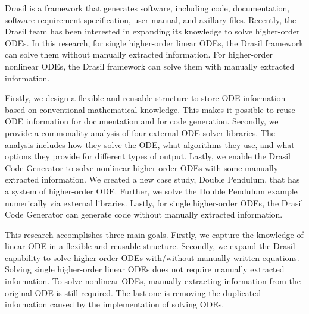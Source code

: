 Drasil is a framework that generates software, including code, documentation, software requirement specification, user manual, and axillary files. Recently, the Drasil team has been interested in expanding its knowledge to solve higher-order ODEs. In this research, for single higher-order linear ODEs, the Drasil framework can solve them without manually extracted information. For higher-order nonlinear ODEs, the Drasil framework can solve them with manually extracted information.

Firstly, we design a flexible and reusable structure to store ODE information based on conventional mathematical knowledge. This makes it possible to reuse ODE information for documentation and for code generation. Secondly, we provide a commonality analysis of four external ODE solver libraries. The analysis includes how they solve the ODE, what algorithms they use, and what options they provide for different types of output. Lastly, we enable the Drasil Code Generator to solve nonlinear higher-order ODEs with some manually extracted information. We created a new case study, Double Pendulum, that has a system of higher-order ODE. Further, we solve the Double Pendulum example numerically via external libraries. Lastly, for single higher-order ODEs, the Drasil Code Generator can generate code without manually extracted information.

This research accomplishes three main goals. Firstly, we capture the knowledge of linear ODE in a flexible and reusable structure. Secondly, we expand the Drasil capability to solve higher-order ODEs with/without manually written equations. Solving single higher-order linear ODEs does not require manually extracted information. To solve nonlinear ODEs, manually extracting information from the original ODE is still required. The last one is removing the duplicated information caused by the implementation of solving ODEs.